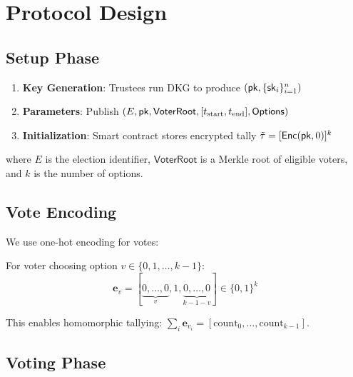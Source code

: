 \documentclass{../shared/luxfhe}
\begin{document}
\section{Protocol Design}

\subsection{Setup Phase}

\begin{protocol}
\begin{enumerate}
    \item \textbf{Key Generation}: Trustees run DKG to produce $(\mathsf{pk}, \{\mathsf{sk}_i\}_{i=1}^n)$
    \item \textbf{Parameters}: Publish $(E, \mathsf{pk}, \mathsf{VoterRoot}, [t_{\text{start}}, t_{\text{end}}], \mathsf{Options})$
    \item \textbf{Initialization}: Smart contract stores encrypted tally $\tilde{\tau} = [\mathsf{Enc}(\mathsf{pk}, 0)]^k$
\end{enumerate}
\end{protocol}

where $E$ is the election identifier, $\mathsf{VoterRoot}$ is a Merkle root of eligible voters, and $k$ is the number of options.

\subsection{Vote Encoding}

We use one-hot encoding for votes:

\begin{definition}
For voter choosing option $v \in \{0, 1, \ldots, k-1\}$:
\[
\mathbf{e}_v = [\underbrace{0, \ldots, 0}_{v}, 1, \underbrace{0, \ldots, 0}_{k-1-v}] \in \{0,1\}^k
\]
\end{definition}

This enables homomorphic tallying: $\sum_i \mathbf{e}_{v_i} = [\text{count}_0, \ldots, \text{count}_{k-1}]$.

\subsection{Voting Phase}
\end{document}
